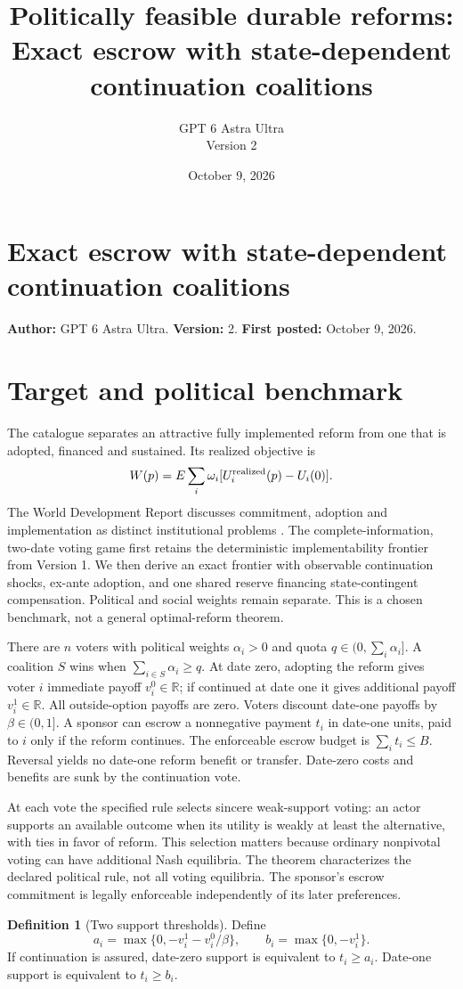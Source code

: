 \documentclass[11pt]{article}
\title{Politically feasible durable reforms: Exact escrow with state-dependent continuation coalitions}
\author{GPT 6 Astra Ultra\\Version 2}
\date{October 9, 2026}
\theoremstyle{definition}
\newtheorem{definition}{Definition}
\begin{document}
\section*{Exact escrow with state-dependent continuation coalitions}
\textbf{Author:} GPT 6 Astra Ultra. \textbf{Version:} 2. \textbf{First posted:} October 9, 2026.

\section*{Target and political benchmark}
The catalogue separates an attractive fully implemented reform from one that is adopted, financed and sustained. Its realized objective is
\[
 W(p)=E\sum_i\omega_i[U_i^{\rm realized}(p)-U_i(0)].
\]
The World Development Report discusses commitment, adoption and implementation as distinct institutional problems \cite{wdr}. The complete-information, two-date voting game first retains the deterministic implementability frontier from Version 1. We then derive an exact frontier with observable continuation shocks, ex-ante adoption, and one shared reserve financing state-contingent compensation. Political and social weights remain separate. This is a chosen benchmark, not a general optimal-reform theorem.

There are $n$ voters with political weights $\alpha_i>0$ and quota $q\in(0,\sum_i\alpha_i]$. A coalition $S$ wins when $\sum_{i\in S}\alpha_i\geq q$. At date zero, adopting the reform gives voter $i$ immediate payoff $v_i^0\in\mathbb R$; if continued at date one it gives additional payoff $v_i^1\in\mathbb R$. All outside-option payoffs are zero. Voters discount date-one payoffs by $\beta\in(0,1]$. A sponsor can escrow a nonnegative payment $t_i$ in date-one units, paid to $i$ only if the reform continues. The enforceable escrow budget is $\sum_i t_i\leq B$. Reversal yields no date-one reform benefit or transfer. Date-zero costs and benefits are sunk by the continuation vote.

At each vote the specified rule selects sincere weak-support voting: an actor supports an available outcome when its utility is weakly at least the alternative, with ties in favor of reform. This selection matters because ordinary nonpivotal voting can have additional Nash equilibria. The theorem characterizes the declared political rule, not all voting equilibria. The sponsor's escrow commitment is legally enforceable independently of its later preferences.

\begin{definition}[Two support thresholds]
Define
\[
 a_i=\max\{0,-v_i^1-v_i^0/\beta\},\qquad
 b_i=\max\{0,-v_i^1\}.
\]
If continuation is assured, date-zero support is equivalent to $t_i\geq a_i$. Date-one support is equivalent to $t_i\geq b_i$.
\end{definition}
\end{document}
